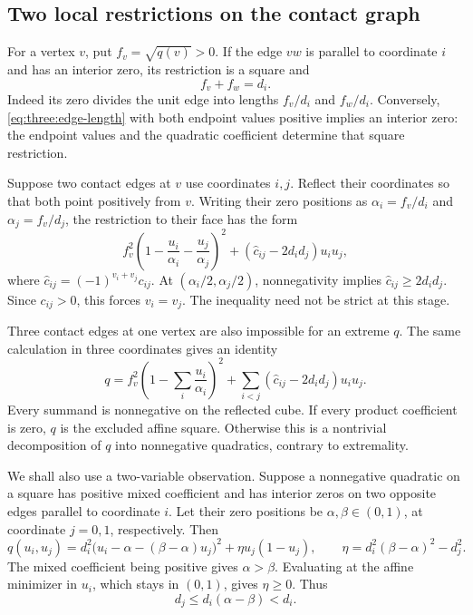\subsection{Two local restrictions on the contact graph}

For a vertex $v$, put $f_v=\sqrt{q(v)}>0$. If the edge $vw$ is parallel to
coordinate $i$ and has an interior zero, its restriction is a square and
\begin{equation}\label{eq:three:edge-length}
 f_v+f_w=d_i.
\end{equation}
Indeed its zero divides the unit edge into lengths $f_v/d_i$ and
$f_w/d_i$. Conversely, \eqref{eq:three:edge-length} with both endpoint
values positive implies an interior zero: the endpoint values and the
quadratic coefficient determine that square restriction.

Suppose two contact edges at $v$ use coordinates $i,j$. Reflect their
coordinates so that both point positively from $v$. Writing their zero
positions as $\alpha_i=f_v/d_i$ and $\alpha_j=f_v/d_j$, the restriction to
their face has the form
\[
 f_v^2\left(1-\frac{u_i}{\alpha_i}
                 -\frac{u_j}{\alpha_j}\right)^2
  + (\widehat c_{ij}-2d_id_j)u_iu_j,
\]
where $\widehat c_{ij}=(-1)^{v_i+v_j}c_{ij}$.
At $(\alpha_i/2,\alpha_j/2)$, nonnegativity implies
$\widehat c_{ij}\ge2d_id_j$. Since $c_{ij}>0$, this forces $v_i=v_j$.
The inequality need not be strict at this stage.

Three contact edges at one vertex are also impossible for an extreme
$q$. The same calculation in three coordinates gives an identity
\[
 q=f_v^2\left(1-\sum_i\frac{u_i}{\alpha_i}\right)^2
       +\sum_{i<j}(\widehat c_{ij}-2d_id_j)u_iu_j.
\]
Every summand is nonnegative on the reflected cube. If every product
coefficient is zero, $q$ is the excluded affine square. Otherwise this is
a nontrivial decomposition of $q$ into nonnegative quadratics, contrary
to extremality.

We shall also use a two-variable observation. Suppose a nonnegative
quadratic on a square has positive mixed coefficient and has interior
zeros on two opposite edges parallel to coordinate $i$. Let their zero
positions be $\alpha,\beta\in(0,1)$, at coordinate $j=0,1$, respectively.
Then
\[
 q(u_i,u_j)=d_i^2\bigl(u_i-\alpha-(\beta-\alpha)u_j\bigr)^2
                 +\eta u_j(1-u_j),\qquad
 \eta=d_i^2(\beta-\alpha)^2-d_j^2.
\]
The mixed coefficient being positive gives $\alpha>\beta$. Evaluating at
the affine minimizer in $u_i$, which stays in $(0,1)$, gives $\eta\ge0$.
Thus
\begin{equation}\label{eq:three:opposite-order}
 d_j\le d_i(\alpha-\beta)<d_i.
\end{equation}

